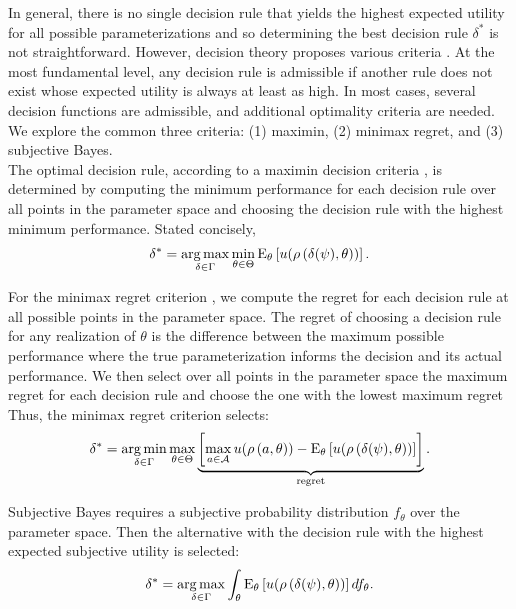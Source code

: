 In general, there is no single decision rule that yields the highest expected utility for all possible parameterizations and so determining the best decision rule  $\delta^*$ is not straightforward. However, decision theory proposes various criteria \citep{Gilboa.2009,Marinacci.2015}. At the most fundamental level, any decision rule is admissible if another rule does not exist whose expected utility is always at least as high. In most cases, several decision functions are admissible, and additional optimality criteria are needed. We explore the common three criteria: (1) maximin, (2) minimax regret, and (3) subjective Bayes.\\

The optimal decision rule, according to a maximin decision criteria \citep{Gilboa.1989,Wald.1950}, is determined by computing the minimum performance for each decision rule over all points in the parameter space and choosing the decision rule with the highest minimum performance. Stated concisely,
%
\begin{align*}
\delta^*= \operatorname*{arg\,max}_{\delta \in \Gamma } \min_{\theta\in \Theta} \mathrm{E}_{\theta}\left[u(\rho\left(\delta(\psi), \theta\right))\right].
\end{align*}

For the minimax regret criterion \citep{Manski.2004,Niehans.1948}, we compute the regret for each decision rule at all possible points in the parameter space. The regret of choosing a decision rule for any realization of $\theta$ is the difference between the maximum possible performance where the true parameterization informs the decision and its actual performance. We then select over all points in the parameter space the maximum regret for each decision rule and choose the one with the lowest maximum regret Thus, the minimax regret criterion selects:
%
\begin{align*}
\delta^* =  \operatorname*{arg\,min}_{\delta \in \Gamma } \max_{\theta\in \Theta}  \underbrace{\left[\max_{a \in \mathcal{A}}  u(\rho\left(a, \theta\right))  - \mathrm{E}_{\theta}\left[u(\rho\left(\delta(\psi), \theta\right)) \right]\right]}_{\text{regret}}.
\end{align*}

Subjective Bayes \citep{Savage.1954} requires a subjective probability distribution $f_{\theta}$ over the parameter space. Then the alternative with the decision rule with the highest expected subjective utility is selected:
%
\begin{align*}
\delta^* = \operatorname*{arg\,max}_{\delta \in \Gamma }  \int_{\theta} \mathrm{E}_{\theta}\left[u(\rho\left(\delta(\psi), \theta\right))\right]df_{\theta}.
\end{align*}
